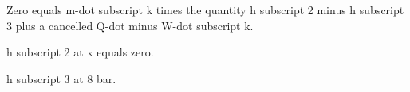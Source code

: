Zero equals m-dot subscript k times the quantity h subscript 2 minus h subscript 3 plus a cancelled Q-dot minus W-dot subscript k.

h subscript 2 at x equals zero.

h subscript 3 at 8 bar.
